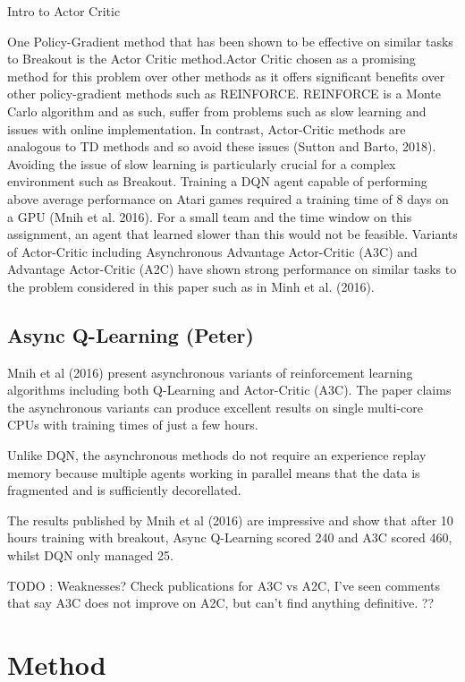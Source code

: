 \documentclass{article}
\begin{document}
Intro to Actor Critic

One Policy-Gradient method that has been shown to be effective on similar tasks to Breakout is the Actor Critic method.Actor Critic chosen as a promising method for this problem over other methods as it offers significant benefits over other policy-gradient methods such as REINFORCE. REINFORCE is a Monte Carlo  algorithm and as such, suffer from problems such as slow learning and issues with online implementation. In contrast, Actor-Critic methods are analogous to TD methods and so avoid these issues (Sutton and Barto, 2018). Avoiding the issue of slow learning is particularly crucial for a complex environment such as Breakout. Training a DQN agent capable of performing above average performance on Atari games required a training time of 8 days on a GPU (Mnih et al. 2016). For a small team and the time window on this assignment, an agent that learned slower than this would not be feasible. Variants of Actor-Critic including Asynchronous Advantage Actor-Critic (A3C) and Advantage Actor-Critic (A2C) have shown strong performance on similar tasks to the problem considered in this paper such as in Minh et al. (2016).


\subsection{Async Q-Learning (Peter)}

Mnih et al (2016) present asynchronous variants of reinforcement learning algorithms including both Q-Learning and Actor-Critic (A3C).
The paper claims the asynchronous variants can produce excellent results on single multi-core CPUs with training times of just a few hours.

Unlike DQN, the asynchronous methods do not require an experience replay memory because multiple agents working in parallel means that the data is fragmented and is sufficiently decorellated.

The results published by Mnih et al (2016) are impressive and show that after 10 hours training with breakout, Async Q-Learning scored 240 and A3C scored 460, whilst DQN only managed 25.

TODO : Weaknesses? Check publications for A3C vs A2C, I've seen comments that say A3C does not improve on A2C, but can't find anything definitive. ??


\section{Method}
\end{document}
